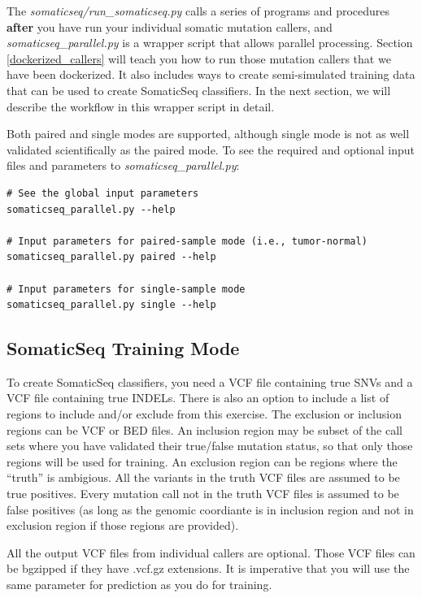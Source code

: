 \documentclass[10pt,letterpaper]{article}
\begin{document}
\begin{sloppypar}
The \textit{somaticseq/run\_somaticseq.py} calls a series of programs and procedures \textbf{after} you have run your individual somatic mutation callers, and \textit{somaticseq\_parallel.py} is a wrapper script that allows parallel processing. Section \ref{dockerized_callers} will teach you how to run those mutation callers that we have been dockerized. It also includes ways to create semi-simulated training data that can be used to create SomaticSeq classifiers. In the next section, we will describe the workflow in this wrapper script in detail. 

Both paired and single modes are supported, although single mode is not as well validated scientifically as the paired mode. To see the required and optional input files and parameters to \textit{somaticseq\_parallel.py}:

\begin{lstlisting}
# See the global input parameters
somaticseq_parallel.py --help

# Input parameters for paired-sample mode (i.e., tumor-normal)
somaticseq_parallel.py paired --help

# Input parameters for single-sample mode
somaticseq_parallel.py single --help
\end{lstlisting}


\subsection{SomaticSeq Training Mode} \label{somaticseq_train}

To create SomaticSeq classifiers, you need a VCF file containing true SNVs and a VCF file containing true INDELs. There is also an option to include a list of regions to include and/or exclude from this exercise. The exclusion or inclusion regions can be VCF or BED files. An inclusion region may be subset of the call sets where you have validated their true/false mutation status, so that only those regions will be used for training. An exclusion region can be regions where the ``truth'' is ambigious. All the variants in the truth VCF files are assumed to be true positives. Every mutation call not in the truth VCF files is assumed to be false positives (as long as the genomic coordiante is in inclusion region and not in exclusion region if those regions are provided). 

All the output VCF files from individual callers are optional. Those VCF files can be bgzipped if they have .vcf.gz extensions. It is imperative that you will use the same parameter for prediction as you do for training. 


\end{sloppypar}
\end{document}
